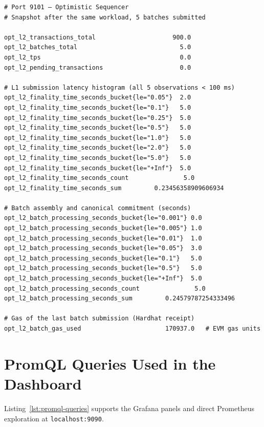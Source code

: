 \begin{listing}[H]
\begin{verbatim}
# Port 9101 — Optimistic Sequencer
# Snapshot after the same workload, 5 batches submitted

opt_l2_transactions_total                     900.0
opt_l2_batches_total                            5.0
opt_l2_tps                                      0.0
opt_l2_pending_transactions                     0.0

# L1 submission latency histogram (all 5 observations < 100 ms)
opt_l2_finality_time_seconds_bucket{le="0.05"}  2.0
opt_l2_finality_time_seconds_bucket{le="0.1"}   5.0
opt_l2_finality_time_seconds_bucket{le="0.25"}  5.0
opt_l2_finality_time_seconds_bucket{le="0.5"}   5.0
opt_l2_finality_time_seconds_bucket{le="1.0"}   5.0
opt_l2_finality_time_seconds_bucket{le="2.0"}   5.0
opt_l2_finality_time_seconds_bucket{le="5.0"}   5.0
opt_l2_finality_time_seconds_bucket{le="+Inf"}  5.0
opt_l2_finality_time_seconds_count               5.0
opt_l2_finality_time_seconds_sum         0.23456358909606934

# Batch assembly and canonical commitment (seconds)
opt_l2_batch_processing_seconds_bucket{le="0.001"} 0.0
opt_l2_batch_processing_seconds_bucket{le="0.005"} 1.0
opt_l2_batch_processing_seconds_bucket{le="0.01"}  1.0
opt_l2_batch_processing_seconds_bucket{le="0.05"}  3.0
opt_l2_batch_processing_seconds_bucket{le="0.1"}   5.0
opt_l2_batch_processing_seconds_bucket{le="0.5"}   5.0
opt_l2_batch_processing_seconds_bucket{le="+Inf"}  5.0
opt_l2_batch_processing_seconds_count               5.0
opt_l2_batch_processing_seconds_sum         0.24579787254333496

# Gas of the last batch submission (Hardhat receipt)
opt_l2_batch_gas_used                       170937.0   # EVM gas units
\end{verbatim}
\caption{Optimistic metrics snapshot}
\label{lst:prometheus-opt}
\end{listing}

\section{PromQL Queries Used in the Dashboard}

Listing~\ref{lst:promql-queries} supports the Grafana panels and direct Prometheus exploration at \texttt{localhost:9090}.

